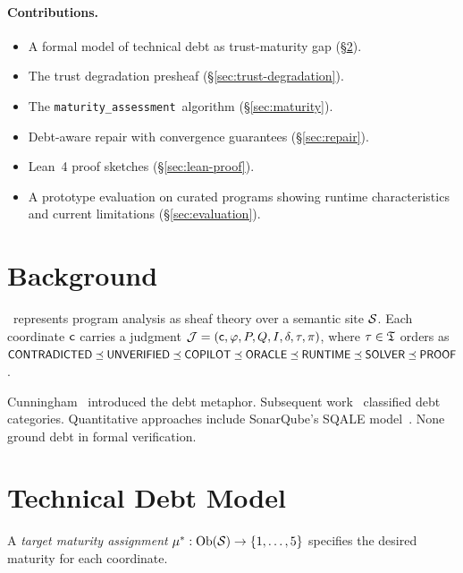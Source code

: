 \documentclass[11pt]{article}
\newcommand{\MaturityAssessment}{\texttt{maturity\_assessment}}
\begin{document}
\paragraph{Contributions.}
\begin{itemize}[noitemsep]
  \item A formal model of technical debt as trust-maturity gap
        (§\ref{sec:debt-model}).
  \item The trust degradation presheaf (§\ref{sec:trust-degradation}).
  \item The \MaturityAssessment\ algorithm (§\ref{sec:maturity}).
  \item Debt-aware repair with convergence guarantees
        (§\ref{sec:repair}).
  \item Lean~4 proof sketches (§\ref{sec:lean-proof}).
  \item A prototype evaluation on \ppLXVIIIprogramCount{} curated programs
        showing runtime characteristics and current limitations
        (§\ref{sec:evaluation}).
\end{itemize}

\section{Background}\label{sec:background}

\JuGeo\ represents program analysis as sheaf theory over a semantic
site $\mathcal{S}$.  Each coordinate $\mathsf{c}$ carries a judgment
$\mathcal{J} = (\mathsf{c}, \varphi, P, Q, I, \delta, \tau, \pi)$,
where $\tau \in \mathfrak{T}$ orders as $\mathsf{CONTRADICTED} \preceq \mathsf{UNVERIFIED} \preceq
\mathsf{COPILOT} \preceq \mathsf{ORACLE} \preceq \mathsf{RUNTIME} \preceq \mathsf{SOLVER} \preceq
\mathsf{PROOF}$.

Cunningham~\cite{Cunningham1992} introduced the debt metaphor.
Subsequent work~\cite{Kruchten2012,Ernst2015} classified debt
categories.  Quantitative approaches include SonarQube's SQALE
model~\cite{Letouzey2012}.  None ground debt in formal verification.

\section{Technical Debt Model}\label{sec:debt-model}

\begin{definition}\label{def:target}
A \emph{target maturity assignment} $\mu^* : \mathrm{Ob}(\mathcal{S}) \to \{1,\ldots,5\}$
specifies the desired maturity for each coordinate.
\end{definition}
\end{document}
